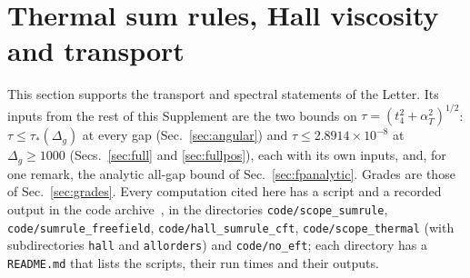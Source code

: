 \section{Thermal sum rules, Hall viscosity and transport}
\label{sec:transport}

This section supports the transport and spectral statements of the Letter. Its inputs from the rest of this Supplement are
the two bounds on $\tau=(t_4^2+\alpha_T^2)^{1/2}$: $\tau\le\tau_*(\Delta_g)$ at every gap (Sec.~\ref{sec:angular}) and
$\tau\le2.8914\times10^{-8}$ at $\Delta_g\ge1000$ (Secs.~\ref{sec:full} and \ref{sec:fullpos}), each with its own inputs, and,
for one remark, the analytic all-gap bound of Sec.~\ref{sec:fpanalytic}. Grades are those of Sec.~\ref{sec:grades}. Every
computation cited here has a script and a recorded output in the code archive~\cite{Zenodo}, in the directories
\texttt{code/scope\_sumrule}, \texttt{code/sumrule\_freefield}, \texttt{code/hall\_sumrule\_cft}, \texttt{code/scope\_thermal} (with subdirectories
\texttt{hall} and \texttt{allorders}) and \texttt{code/no\_eft}; each directory has a \texttt{README.md} that lists the
scripts, their run times and their outputs.

